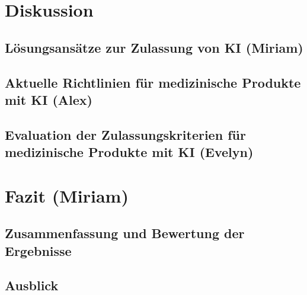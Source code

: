\documentclass[a4paper, 11pt]{article}
\begin{document}
	\section{Diskussion}\label{sec:discussion}
		
		\subsection{Lösungsansätze zur Zulassung von KI  \small{(Miriam)}} \label{sec:solutions}
			
		\subsection{Aktuelle Richtlinien für medizinische Produkte mit KI \small{(Alex)}}\label{sec:guidlines}
			
		\subsection{Evaluation der Zulassungskriterien für medizinische Produkte mit KI \small{(Evelyn)}}\label{sec:sufficient-criteria}
			
		
	
	\newpage
	\section{Fazit \small{(Miriam)}}\label{sec:conclusion}
		
		\subsection{Zusammenfassung und Bewertung der Ergebnisse}\label{sec:summary}
			
		\subsection{Ausblick}\label{sec:perspective}
			
	  

    \newpage
    \printglossary[type=\acronymtype,title={Akronyme}]
   
    \newpage
    \nocite{*}
    \printbibliography[heading=bibintoc,type=article, title={Literatur}]
	
    \newpage
    \printglossary[type=main,title={Glossar}]
\end{document}
